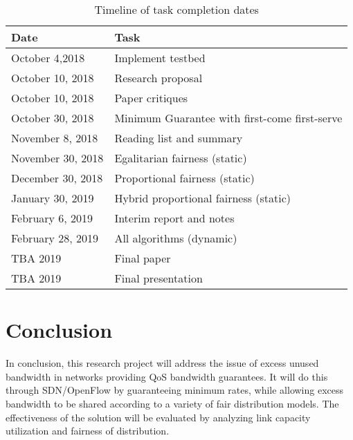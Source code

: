 \documentclass[accepted,single]{gipaper}
\begin{document}
\begin{table}[htpb]
	\label{timeline_table}
	\begin{center}
		\begin{small}
			\begin{tabular}{ll}
				Date & Task\\
				\hline
				October 4,2018 & Implement testbed \\
				October 10, 2018   &  Research proposal    \\
				October 10, 2018   &  Paper critiques    \\
				October 30, 2018 & Minimum Guarantee with first-come first-serve \\
				November 8, 2018   &  Reading list and summary    \\
				November 30, 2018 & Egalitarian fairness (static) \\
				December 30, 2018 & Proportional fairness (static) \\
				January 30, 2019 & Hybrid proportional fairness (static) \\
				February 6, 2019   &  Interim report and notes    \\
				February 28, 2019 & All algorithms (dynamic) \\
				TBA 2019     & Final paper    \\
				TBA 2019     & Final presentation 
			\end{tabular}
		\end{small}
	\end{center}
	\caption{Timeline of task completion dates}
\end{table}

\section{Conclusion}
\label{conclusion}

In conclusion, this research project will address the issue of excess unused bandwidth in networks providing QoS bandwidth guarantees. It will do this through SDN/OpenFlow by guaranteeing minimum rates, while allowing excess bandwidth to be shared according to a variety of fair distribution models. The effectiveness of the solution will be evaluated by analyzing link capacity utilization and fairness of distribution.


\end{document}
